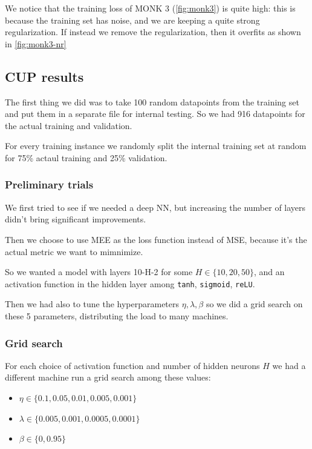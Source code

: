 We notice that the training loss of MONK 3 (\cref{fig:monk3}) is quite high: this is because the training set has noise, and we are keeping a quite strong regularization.
If instead we remove the regularization, then it overfits as shown in \cref{fig:monk3-nr}


\clearpage

\subsection{CUP results}

The first thing we did was to take 100 random datapoints from the training set and put them in a separate file for internal testing. So we had 916 datapoints for the actual training and validation.

For every training instance we randomly split the internal training set at random for 75\% actaul training and 25\% validation.

\subsubsection{Preliminary trials}

We first tried to see if we needed a deep NN, but increasing the number of layers didn't bring significant improvements.

Then we choose to use MEE as the loss function instead of MSE, because it's the actual metric we want to mimnimize.

So we wanted a model with layers 10-H-2 for some $H\in\{ 10, 20, 50 \}$, and an activation function in the hidden layer among \texttt{tanh}, \texttt{sigmoid}, \texttt{reLU}.

Then we had also to tune the hyperparameters $\eta,\lambda,\beta$ so we did a grid search on these 5 parameters, distributing the load to many machines.

\subsubsection{Grid search}

For each choice of activation function and number of hidden neurons $H$ we had a different machine run a grid search among these values:
\begin{itemize}
    \item $\eta\in\{ 0.1, 0.05, 0.01, 0.005, 0.001 \}$
    \item $\lambda\in\{ 0.005, 0.001, 0.0005, 0.0001 \}$
    \item $\beta\in\{ 0, 0.95 \}$
\end{itemize}

